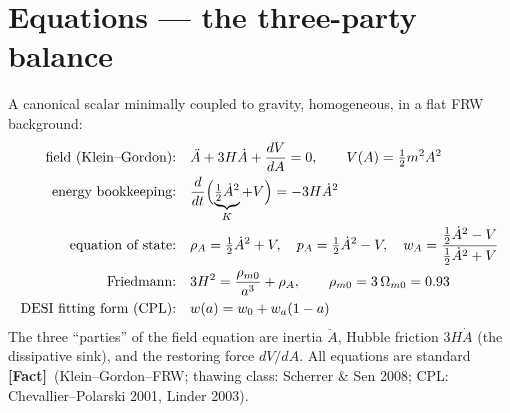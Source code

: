 \documentclass[11pt]{article}
\newcommand{\Fact}{\textbf{\textcolor{green!45!black}{[Fact]}}}
\begin{document}
\section{Equations --- the three-party balance}
A canonical scalar minimally coupled to gravity, homogeneous, in a flat FRW background:
\begin{align}
\text{field (Klein--Gordon):}\quad & \ddot A+3H\dot A+\frac{dV}{dA}=0,\qquad V(A)=\tfrac12 m^2A^2 \label{eq:p2kg}\\
\text{energy bookkeeping:}\quad & \frac{d}{dt}\Bigl(\underbrace{\tfrac12\dot A^2}_{K}+V\Bigr)=-3H\dot A^2 \label{eq:p2energy}\\
\text{equation of state:}\quad & \rho_A=\tfrac12\dot A^2+V,\quad p_A=\tfrac12\dot A^2-V,\quad
w_A=\frac{\tfrac12\dot A^2-V}{\tfrac12\dot A^2+V} \label{eq:p2eos}\\
\text{Friedmann:}\quad & 3H^2=\frac{\rho_{m0}}{a^3}+\rho_A,\qquad \rho_{m0}=3\,\Omega_{m0}=0.93 \label{eq:p2fried}\\
\text{DESI fitting form (CPL):}\quad & w(a)=w_0+w_a(1-a) \label{eq:p2cpl}
\end{align}
The three ``parties'' of the field equation are inertia $\ddot A$, Hubble friction $3H\dot A$ (the dissipative sink), and the restoring force $dV/dA$. All equations are standard \Fact\ (Klein--Gordon--FRW; thawing class: Scherrer \& Sen 2008; CPL: Chevallier--Polarski 2001, Linder 2003).

\end{document}
